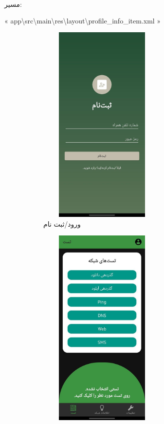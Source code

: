 \documentclass{report}
\begin{document}
\begin{note}{مسیر:}
	\begin{latin}
		« app\textbackslash src\textbackslash main\textbackslash res\textbackslash layout\textbackslash profile\_info\_item.xml »
	\end{latin}
\end{note}
\begin{figure}[ht]
	\centering
	\begin{subfigure}[b]{0.3\textwidth}\centering
	\includegraphics[width=0.7\textwidth,height=10cm,keepaspectratio]{Pic/signup}
		\caption{ورود/ثبت نام}
		\label{fig:auth}
	\end{subfigure}
	\begin{subfigure}[b]{0.3\textwidth}\centering
	\includegraphics[width=0.7\textwidth,height=10cm,keepaspectratio]{Pic/test}

\end{subfigure}
\end{figure}
\end{document}

